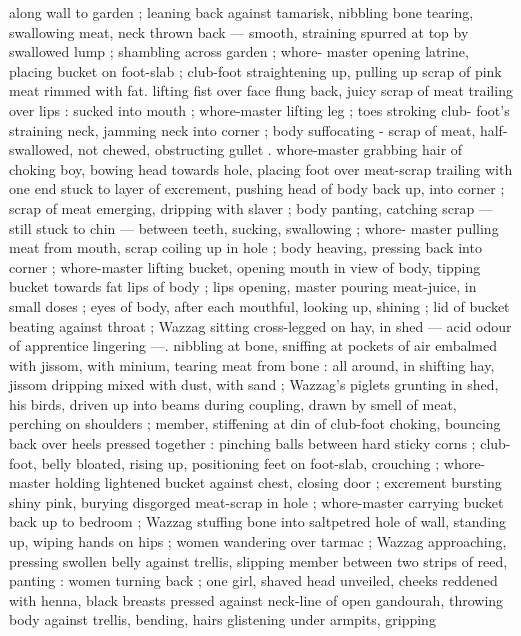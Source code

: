 along wall to garden ; leaning back against tamarisk, nibbling bone 
tearing, swallowing meat, neck thrown back --- smooth, straining 
spurred at top by swallowed lump ; shambling across garden ; whore- 
master opening latrine, placing bucket on foot-slab ; club-foot 
straightening up, pulling up scrap of pink meat rimmed with fat. 
lifting fist over face flung back, juicy scrap of meat trailing over lips 
: sucked into mouth ; whore-master lifting leg ; toes stroking club- 
foot's straining neck, jamming neck into corner ; body suffocating - 
scrap of meat, half-swallowed, not chewed, obstructing gullet . 
whore-master grabbing hair of choking boy, bowing head towards 
hole, placing foot over meat-scrap trailing with one end stuck to layer 
of excrement, pushing head of body back up, into corner ; scrap of 
meat emerging, dripping with slaver ; body panting, catching scrap 
--- still stuck to chin --- between teeth, sucking, swallowing ; whore- 
master pulling meat from mouth, scrap coiling up in hole ; body 
heaving, pressing back into corner ; whore-master lifting bucket, 
opening mouth in view of body, tipping bucket towards fat lips of 
body ; lips opening, master pouring meat-juice, in small doses ; eyes 
of body, after each mouthful, looking up, shining ; lid of bucket 
beating against throat ; Wazzag sitting cross-legged on hay, in shed 
--- acid odour of apprentice lingering ---. nibbling at bone, sniffing 
at pockets of air embalmed with jissom, with minium, tearing meat 
from bone : all around, in shifting hay, jissom dripping mixed with 
dust, with sand ; Wazzag's piglets grunting in shed, his birds, driven 
up into beams during coupling, drawn by smell of meat, perching on 
shoulders ; member, stiffening at din of club-foot choking, bouncing 
back over heels pressed together : pinching balls between hard 
sticky corns ; club-foot, belly bloated, rising up, positioning feet on 
foot-slab, crouching ; whore-master holding lightened bucket against 
chest, closing door ; excrement bursting shiny pink, burying 
disgorged meat-scrap in hole ; whore-master carrying bucket back 
up to bedroom ; Wazzag stuffing bone into saltpetred hole of wall, 
standing up, wiping hands on hips ; women wandering over tarmac ; 
Wazzag approaching, pressing swollen belly against trellis, slipping 
member between two strips of reed, panting : women turning back ; 
one girl, shaved head unveiled, cheeks reddened with henna, black 
breasts pressed against neck-line of open gandourah, throwing body 
against trellis, bending, hairs glistening under armpits, gripping 
